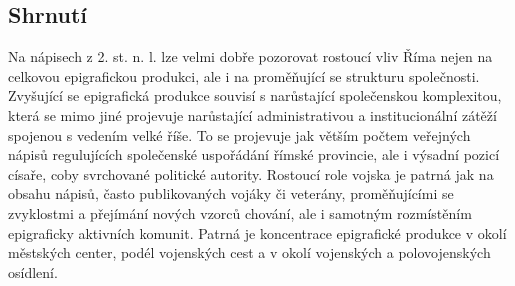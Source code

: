 
\subsection[shrnutí-17]{Shrnutí}

Na nápisech z 2. st. n. l. lze velmi dobře pozorovat rostoucí vliv Říma nejen na celkovou epigrafickou produkci, ale i na proměňující se strukturu společnosti. Zvyšující se epigrafická produkce souvisí s narůstající společenskou komplexitou, která se mimo jiné projevuje narůstající administrativou a institucionální zátěží spojenou s vedením velké říše. To se projevuje jak větším počtem veřejných nápisů regulujících společenské uspořádání římské provincie, ale i výsadní pozicí císaře, coby svrchované politické autority. Rostoucí role vojska je patrná jak na obsahu nápisů, často publikovaných vojáky či veterány, proměňujícími se zvyklostmi a přejímání nových vzorců chování, ale i samotným rozmístěním epigraficky aktivních komunit. Patrná je koncentrace epigrafické produkce v okolí městských center, podél vojenských cest a v okolí vojenských a polovojenských osídlení.

